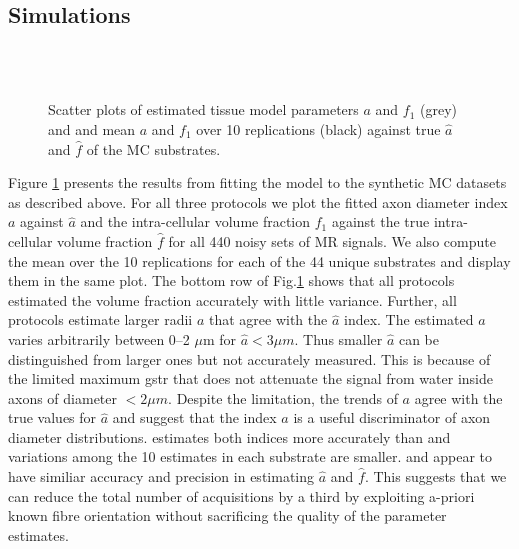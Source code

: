 \subsection{Simulations}
\begin{figure}
\centering
		\\
		\\
		 
  \caption{Scatter plots of estimated tissue model parameters $a$ and $f_1$ (grey) and and mean $a$ and $f_1$ over 10 replications (black) against true $\hat{a}$ and $\hat{f}$ of the MC substrates.}
  \label{fig:experiment4:mc simulations}
\end{figure}
Figure \ref{fig:experiment4:mc simulations} presents the results from fitting the model to the synthetic MC datasets as described above. For all three protocols we plot the fitted axon diameter index $a$ against $\hat{a}$ and the intra-cellular volume fraction $f_1$ against the true intra-cellular volume fraction $\hat{f}$ for all 440 noisy sets of MR signals. We also compute the mean over the 10 replications for each of the 44 unique substrates and display them in the same plot. The bottom row of Fig.\ref{fig:experiment4:mc simulations} shows that all protocols estimated the volume fraction accurately with little variance. Further, all protocols estimate larger radii $a$ that agree with the $\hat{a}$ index. The estimated $a$ varies arbitrarily between 0--2 $\mu$m for $\hat{a} < 3\mu m$. Thus smaller $\hat{a}$ can be distinguished from larger ones but not accurately measured. This is because of the limited maximum {\gls{gstr}} that does not attenuate the signal from water inside axons of diameter $<2\mu m$. Despite the limitation, the trends of $a$ agree with the true
values for $\hat{a}$ and suggest that the index $a$ is a useful discriminator of axon diameter distributions. \SFlong{} estimates both indices more accurately than \OIlong{} and variations among the 10 estimates in each substrate are smaller. \SFshort{} and \OIlong{} appear to have similiar accuracy and precision in estimating $\hat{a}$ and $\hat{f}$. This suggests that we can reduce the total number of acquisitions by a third by exploiting a-priori known fibre orientation without sacrificing the quality of the parameter estimates.

